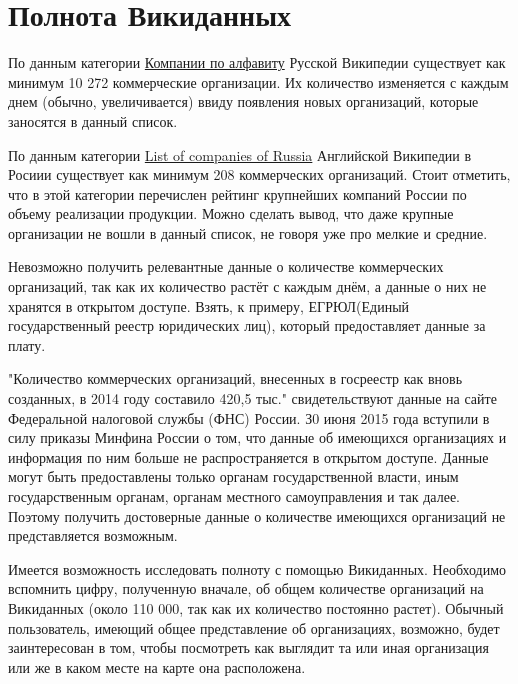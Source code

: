 \section*{Полнота Викиданных}

По данным категории \href{https://ru.wikipedia.org/wiki/%D0%9A%D0%B0%D1%82%D0%B5%D0%B3%D0%BE%D1%80%D0%B8%D1%8F:%D0%9A%D0%BE%D0%BC%D0%BF%D0%B0%D0%BD%D0%B8%D0%B8_%D0%BF%D0%BE_%D0%B0%D0%BB%D1%84%D0%B0%D0%B2%D0%B8%D1%82%D1%83}{Компании по алфавиту} Русской Википедии существует как минимум 10 272 коммерческие организации. Их количество изменяется с каждым днем (обычно, увеличивается) ввиду появления новых организаций, которые заносятся в данный список.

По данным категории \href{https://en.wikipedia.org/wiki/List_of_companies_of_Russia}{List of companies of Russia} Английской Википедии в Росиии существует как минимум 208 коммерческих организаций. Стоит отметить, что в этой категории перечислен рейтинг крупнейших компаний России по объему реализации продукции. Можно сделать вывод, что даже крупные организации не вошли в данный список, не говоря уже про мелкие и средние.

Невозможно получить релевантные данные о количестве коммерческих организаций, так как их количество растёт с каждым днём, а данные о них не хранятся в открытом доступе. Взять, к примеру, ЕГРЮЛ(Единый государственный реестр юридических лиц), который предоставляет данные за плату. \cite{egrul}

"Количество коммерческих организаций, внесенных в госреестр как вновь созданных, в 2014 году составило 420,5 тыс."  свидетельствуют данные на сайте Федеральной налоговой службы (ФНС) России. З0 июня 2015 года вступили в силу приказы Минфина России о том, что данные об имеющихся организациях и информация по ним больше не распространяется в открытом доступе. Данные могут быть предоставлены только органам государственной власти, иным государственным органам, органам местного самоуправления и так далее. Поэтому получить достоверные данные о количестве имеющихся организаций не представляется возможным.

Имеется возможность исследовать полноту с помощью Викиданных. Необходимо вспомнить цифру, полученную вначале, об общем количестве организаций на Викиданных (около 110 000, так как их количество постоянно растет). Обычный пользователь, имеющий общее представление об организациях, возможно, будет заинтересован в том, чтобы посмотреть как выглядит та или иная организация или же в каком месте на карте она расположена.

